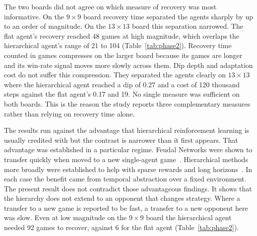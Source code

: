 \documentclass[sigconf,nonacm]{acmart}
\begin{document}
The two boards did not agree on which measure of recovery was most informative. On the $9\times9$ board recovery time separated the agents sharply by up to an order of magnitude. On the $13\times13$ board this separation narrowed. The flat agent's recovery reached 48 games at high magnitude, which overlaps the hierarchical agent's range of 21 to 104 (Table~\ref{tab:phase2}). Recovery time counted in games compresses on the larger board because its games are longer and its win-rate signal moves more slowly across them. Dip depth and adaptation cost do not suffer this compression. They separated the agents clearly on $13\times13$ where the hierarchical agent reached a dip of 0.27 and a cost of 120 thousand steps against the flat agent's 0.17 and 19. No single measure was sufficient on both boards. This is the reason the study reports three complementary measures rather than relying on recovery time alone.

\medskip

The results run against the advantage that hierarchical reinforcement learning is usually credited with but the contrast is narrower than it first appears. That advantage was established in a particular regime. Feudal Networks were shown to transfer quickly when moved to a new single-agent game~\cite{vezhnevets2017feudal}. Hierarchical methods more broadly were established to help with sparse rewards and long horizons~\cite{kulkarni2016hierarchical, sutton1999between}. In each case the benefit came from temporal abstraction over a fixed environment. The present result does not contradict those advantageous findings. It shows that the hierarchy does not extend to an opponent that changes strategy. Where a transfer to a new game is reported to be fast, a transfer to a new opponent here was slow. Even at low magnitude on the $9\times9$ board the hierarchical agent needed 92 games to recover, against 6 for the flat agent (Table~\ref{tab:phase2}).
\end{document}
